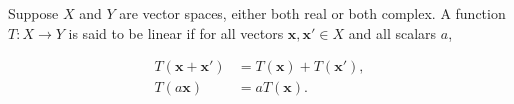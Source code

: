 Suppose $X$ and $Y$ are vector spaces, either both real or both complex. A function $T: X \to Y$ is said to be linear if for all vectors $\mathbf{x}, \mathbf{x}' \in X$ and all scalars $a$,

\begin{align*}
T(\mathbf{x} + \mathbf{x}') &= T(\mathbf{x}) + T(\mathbf{x}'),\\
T(a\mathbf{x}) &= a T(\mathbf{x}).
\end{align*}
